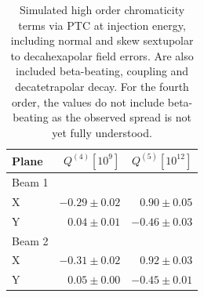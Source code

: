 \begin{table}[!htb]
  \centering
  \begin{tabular}{lrr}
  \toprule
      Plane     &  $Q^{(4)} [10^9]$  &  $Q^{(5)} [10^{12}]$ \\
  \midrule
      Beam 1    &              &               \\
      \hspace{2mm}X         & $-0.29 \pm 0.02$ & $ 0.90 \pm 0.05$  \\
      \hspace{2mm}Y         & $ 0.04 \pm 0.01$ & $-0.46 \pm 0.03$  \\
      Beam 2    &  &   \\
      \hspace{2mm}X         & $-0.31 \pm 0.02$ & $ 0.92 \pm 0.03$ \\
      \hspace{2mm}Y         & $ 0.05 \pm 0.00$ & $-0.45 \pm 0.01$ \\
  \bottomrule
  \end{tabular}
  \caption{Simulated high order chromaticity terms via PTC at injection energy, including normal and
  skew sextupolar to decahexapolar field errors. Are also included beta-beating, coupling and
  decatetrapolar decay. For the fourth order, the values do not include beta-beating as the observed
  spread is not yet fully understood.}
  \label{tab:high_orders:ptc_values}
\end{table}

